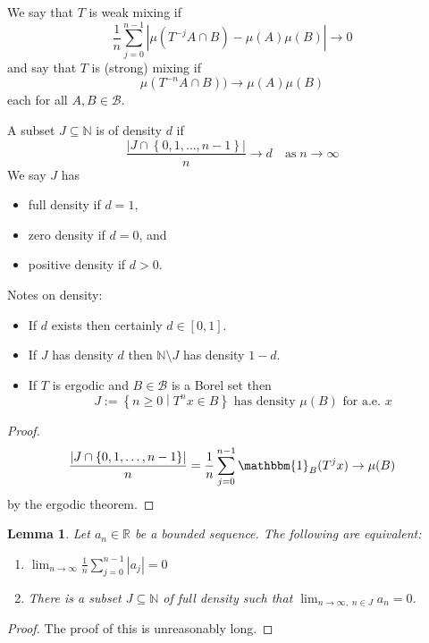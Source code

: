 \documentclass[11pt]{article}
\newcommand{\defeq}{:=}
\newcommand{\abs}[1]{\left|#1\right|}
\newcommand{\indic}[1]{\mathbbm{1}_{#1}}
\newcommand{\relmiddle}[1]{\mathrel{}\middle#1\mathrel{}}
\newcommand{\rmv}{\relmiddle|}
\newcommand{\R}{\mathbb{R}}
\newcommand{\N}{\mathbb{N}}
\newenvironment{defin}
	{\begin{mdframed}[backgroundcolor=white, roundcorner=5pt, linewidth=1pt, linecolor=RoyalBlue]}
	{\end{mdframed}}
\newcommand{\mdf}[1]{{\color{RoyalBlue} #1}}
\newtheorem{lemma}[prop]{Lemma}
\begin{document}
\begin{defin}
	We say that $T$ is \mdf{weak mixing} if
	\[
		\frac{1}{n}\sum_{j=0}^{n-1}\abs{\mu(T^{-j}A\cap B) - \mu(A)\mu(B)} \to 0
	\]
	and say that $T$ is \mdf{(strong) mixing} if
	\[
		\mu(T^{-n}A\cap B)) \to \mu(A)\mu(B)
	\]
	each for all $A, B\in\mathcal{B}$.

	A subset $J\subseteq \N$ is of \mdf{density $d$} if
	\[
		\frac{\abs{J\cap \left\{ 0, 1, \dots , n-1\right\}}}{n}\to d\quad \text{as} \; n\to\infty
	\]
	We say $J$ has
	\begin{itemize}
		\item \mdf{full density} if $d=1$,
		\item \mdf{zero density} if $d=0$, and
		\item \mdf{positive density} if $d>0$.
	\end{itemize}
\end{defin}

Notes on density:
\begin{itemize}
	\item If $d$ exists then certainly $d\in \left[ 0, 1\right]$.
	\item If $J$ has density $d$ then $\N \setminus J$ has density $1-d$.
	\item If $T$ is ergodic and $B\in\mathcal{B}$ is a Borel set then
		\[
			J\defeq\left\{ n \geq 0 \rmv T^n x \in B\right\}\text{ has density }\mu(B) \text{ for a.e. }x
		\]
\end{itemize}

\begin{proof}
\[
	\frac{\abs{J\cap \left\{ 0, 1, \dots, n-1\right\}}}{n}= \frac{1}{n}\sum_{j=0}^{n-1}\indic{B}(T^j x) \to \mu(B)
\]
by the ergodic theorem.
\end{proof}

\begin{lemma}
Let $a_n\in\R$ be a bounded sequence.
The following are equivalent:
\begin{enumerate}
	\item $\lim_{n\to\infty}\frac{1}{n}\sum_{j=0}^{n-1}\abs{a_j} = 0$
	\item There is a subset $J\subseteq\N$ of full density such that $\lim_{n\to\infty, \; n\in J}a_n =0$.
\end{enumerate}
\end{lemma}

\begin{proof}
The proof of this is unreasonably long.
\end{proof}
\end{document}
